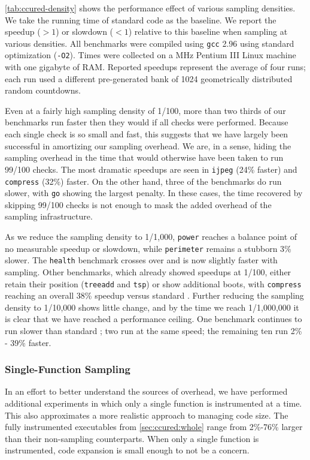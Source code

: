 \autoref{tab:ccured-density} shows the performance effect of various
sampling densities.  We take the running time of standard \CCured code
as the baseline.  We report the speedup ($>1$) or slowdown ($<1$)
relative to this baseline when sampling at various densities.  All
benchmarks were compiled using \texttt{gcc} 2.96 using standard
optimization (\texttt{-O2}).  Times were collected on a \unknown MHz
Pentium III Linux machine with one gigabyte of RAM.  Reported speedups
represent the average of four runs; each run used a different
pre-generated bank of 1024 geometrically distributed random
countdowns.

Even at a fairly high sampling density of 1/100, more than two thirds
of our benchmarks run faster then they would if all checks were
performed.  Because each single check is so small and fast, this
suggests that we have largely been successful in amortizing our
sampling overhead.  We are, in a sense, hiding the sampling overhead
in the time that would otherwise have been taken to run 99/100 checks.
The most dramatic speedups are seen in \texttt{ijpeg} (24\% faster)
and \texttt{compress} (32\%) faster.  On the other hand, three of the
benchmarks do run slower, with \texttt{go} showing the largest
penalty.  In these cases, the time recovered by skipping 99/100 checks
is not enough to mask the added overhead of the sampling
infrastructure.

As we reduce the sampling density to 1/1,000, \texttt{power} reaches a
balance point of no measurable speedup or slowdown, while
\texttt{perimeter} remains a stubborn 3\% slower.  The \texttt{health}
benchmark crosses over and is now slightly faster with sampling.
Other benchmarks, which already showed speedups at 1/100, either
retain their position (\texttt{treeadd} and \texttt{tsp}) or show
additional boots, with \texttt{compress} reaching an overall 38\%
speedup versus standard \CCured.  Further reducing the sampling
density to 1/10,000 shows little change, and by the time we reach
1/1,000,000 it is clear that we have reached a performance ceiling.
One benchmark continues to run slower than standard \CCured; two run
at the same speed; the remaining ten run 2\% - 39\% faster.

\subsubsection{Single-Function Sampling}

In an effort to better understand the sources of overhead, we have
performed additional experiments in which only a single function is
instrumented at a time.  This also approximates a more realistic
approach to managing code size.  The fully instrumented executables
from \autoref{sec:ccured:whole} range from 2\%-76\% larger than their
non-sampling counterparts.  When only a single function is
instrumented, code expansion is small enough to not be a concern.

